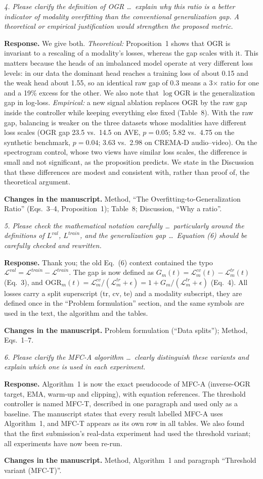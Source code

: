 \documentclass[11pt,a4paper]{article}
\newcommand{\rc}[1]{\par\noindent\colorbox{gray!12}{\parbox{\dimexpr\linewidth-2\fboxsep}{\small\textit{#1}}}\par}
\newcommand{\resp}{\par\noindent\textbf{Response.} }
\newcommand{\chg}{\par\noindent\textbf{Changes in the manuscript.} }
\newcommand{\OGR}{\mathrm{OGR}}
\begin{document}
\rc{4. Please clarify the definition of OGR \ldots\ explain why this ratio is a better indicator of modality overfitting than the conventional generalization gap. A theoretical or empirical justification would strengthen the proposed metric.}
\resp We give both. \emph{Theoretical:} Proposition~1 shows that OGR is invariant to a rescaling of a modality's losses, whereas the gap scales with it. This matters because the heads of an imbalanced model operate at very different loss levels: in our data the dominant head reaches a training loss of about 0.15 and the weak head about 1.55, so an identical raw gap of 0.3 means a 3$\times$ ratio for one and a 19\% excess for the other. We also note that $\log\OGR$ is the generalization gap in log-loss. \emph{Empirical:} a new signal ablation replaces OGR by the raw gap inside the controller while keeping everything else fixed (Table~8). With the raw gap, balancing is weaker on the three datasets whose modalities have different loss scales (OGR gap 23.5 vs.\ 14.5 on AVE, $p{=}0.05$; 5.82 vs.\ 4.75 on the synthetic benchmark, $p{=}0.04$; 3.63 vs.\ 2.98 on CREMA-D audio--video). On the spectrogram control, whose two views have similar loss scales, the difference is small and not significant, as the proposition predicts. We state in the Discussion that these differences are modest and consistent with, rather than proof of, the theoretical argument.
\chg Method, ``The Overfitting-to-Generalization Ratio'' (Eqs.~3--4, Proposition~1); Table~8; Discussion, ``Why a ratio''.

\rc{5. Please check the mathematical notation carefully \ldots\ particularly around the definitions of $L^{val}$, $L^{train}$, and the generalization gap \ldots\ Equation (6) should be carefully checked and rewritten.}
\resp Thank you; the old Eq.~(6) context contained the typo $\mathcal{L}^{val}=\mathcal{L}^{train}-\mathcal{L}^{train}$. The gap is now defined as $G_m(t)=\mathcal{L}^{cv}_m(t)-\mathcal{L}^{tr}_m(t)$ (Eq.~3), and $\OGR_m(t)=\mathcal{L}^{cv}_m/(\mathcal{L}^{tr}_m+\epsilon)=1+G_m/(\mathcal{L}^{tr}_m+\epsilon)$ (Eq.~4). All losses carry a split superscript (tr, cv, te) and a modality subscript, they are defined once in the ``Problem formulation'' section, and the same symbols are used in the text, the algorithm and the tables.
\chg Problem formulation (``Data splits''); Method, Eqs.~1--7.

\rc{6. Please clarify the MFC-A algorithm \ldots\ clearly distinguish these variants and explain which one is used in each experiment.}
\resp Algorithm~1 is now the exact pseudocode of MFC-A (inverse-OGR target, EMA, warm-up and clipping), with equation references. The threshold controller is named MFC-T, described in one paragraph and used only as a baseline. The manuscript states that every result labelled MFC-A uses Algorithm~1, and MFC-T appears as its own row in all tables. We also found that the first submission's real-data experiment had used the threshold variant; all experiments have now been re-run.
\chg Method, Algorithm~1 and paragraph ``Threshold variant (MFC-T)''.
\end{document}

